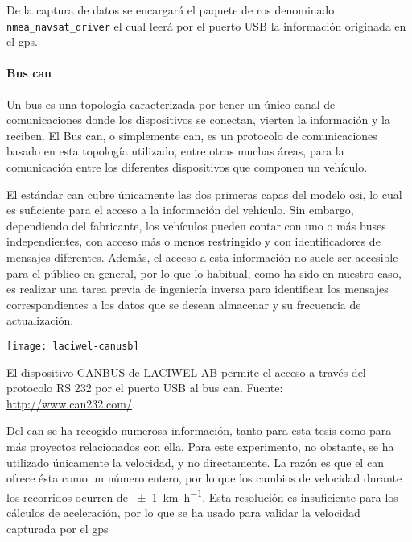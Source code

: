De la captura de datos se encargará el paquete de \ac{ros} denominado \texttt{nmea\_navsat\_driver}  el cual leerá por el puerto USB la información originada en el \Acrshort{gps}.

\paragraph{Bus \Acrshort{can}}

Un bus es una topología caracterizada por tener un único canal de comunicaciones donde los dispositivos se conectan, vierten la información y la reciben. El Bus \Acrshort{can}, o simplemente \Acrshort{can}, es un protocolo de comunicaciones basado en esta topología utilizado, entre otras muchas áreas, para la comunicación entre los diferentes dispositivos que componen un vehículo.

El estándar \Acrshort{can} cubre únicamente las dos primeras capas del modelo \ac{osi}, lo cual es suficiente para el acceso a la información del vehículo. Sin embargo, dependiendo del fabricante, los vehículos pueden contar con uno o más buses independientes, con acceso más o menos restringido y con identificadores de mensajes diferentes. Además, el acceso a esta información no suele ser accesible para el público en general, por lo que lo habitual, como ha sido en nuestro caso, es realizar una tarea previa de ingeniería inversa para identificar los mensajes correspondientes a los datos que se desean almacenar y su frecuencia de actualización.

\begin{marginfigure}
	\centering
	\texttt{[image: laciwel-canusb]}
	\caption[Dispositivo \acrshort{can} BUS de LACIWEL AB]{El dispositivo CANBUS de LACIWEL AB permite el acceso a través del protocolo RS 232 por el puerto USB al bus \ac{can}. Fuente: \url{http://www.can232.com/}.}
	\label{fig:laciwel-canusb}
\end{marginfigure}

Del \Acrshort{can} se ha recogido numerosa información, tanto para esta tesis como para más proyectos relacionados con ella. Para este experimento, no obstante, se ha utilizado únicamente la velocidad, y no directamente. La razón es que el \Acrshort{can} ofrece ésta como un número entero, por lo que los cambios de velocidad durante los recorridos ocurren de \SI{\pm1}{\km\per\hour}. Esta resolución es insuficiente para los cálculos de aceleración, por lo que se ha usado para validar la velocidad capturada por el \Acrshort{gps}

